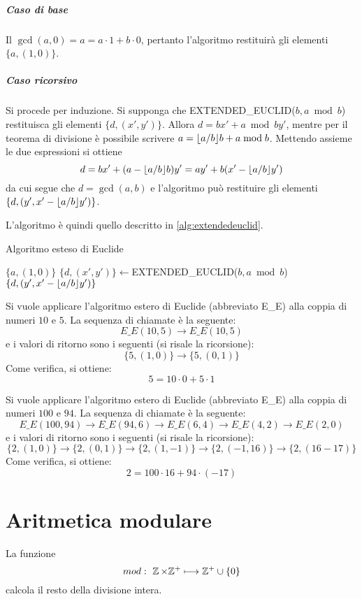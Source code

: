 \subparagraph{Caso di base} Il $\gcd(a,0)=a=a\cdot 1 + b\cdot 0$, pertanto l'algoritmo restituirà gli elementi $\{a, (1,0)\}$.
\subparagraph{Caso ricorsivo} Si procede per induzione. Si supponga che EXTENDED\_EUCLID($b,a\bmod b$) restituisca gli elementi $\{d, (x',y')\}$. Allora $d=bx' + a\bmod by'$, mentre per il teorema di divisione è possibile scrivere $a=\lfloor a/b\rfloor b+a\bmod b$. Mettendo assieme le due espressioni si ottiene
\[
d=bx' + (a-\lfloor a/b\rfloor b)y'=ay'+b(x'-\lfloor a/b\rfloor y')
\]
da cui segue che $d=\gcd(a,b)$ e l'algoritmo può restituire gli elementi $\{d, (y',x'-\lfloor a/b\rfloor y')\}$.


L'algoritmo è quindi quello descritto in \ref{alg:extendedeuclid}.


\begin{algorithm}
\caption{Algoritmo esteso di Euclide}
\label{alg:extendedeuclid}
\begin{algorithmic}
		\State \Return $\{a, (1,0)\}$
	\EndIf
	\State $\{d, (x',y')\} \gets $EXTENDED\_EUCLID($b,a\bmod b$)
	\State \Return $\{d, (y',x'-\lfloor a/b\rfloor y')\}$
\EndFunction
\end{algorithmic}
\end{algorithm}

\begin{esempio}
 Si vuole applicare l'algoritmo estero di Euclide (abbreviato E\_E) alla coppia di numeri $10$ e $5$. La sequenza di chiamate è la seguente:
 \[
  E\_E(10,5) \longrightarrow E\_E(10,5)
 \]
 e i valori di ritorno sono i seguenti (si risale la ricorsione):
 \[
  \{5, (1,0)\} \longrightarrow \{5, (0,1)\}
 \]
 Come verifica, si ottiene:
 \[
  5 = 10 \cdot 0 + 5 \cdot 1
 \]
\end{esempio}

\begin{esempio}
 Si vuole applicare l'algoritmo estero di Euclide (abbreviato E\_E) alla coppia di numeri $100$ e $94$. La sequenza di chiamate è la seguente:
 \[
  E\_E(100,94) \longrightarrow E\_E(94,6) \longrightarrow E\_E(6,4) \longrightarrow E\_E(4,2) \longrightarrow E\_E(2,0)
 \]
 e i valori di ritorno sono i seguenti (si risale la ricorsione):
 \[
  \{2, (1,0)\} \longrightarrow \{2, (0,1)\} \longrightarrow \{2, (1,-1)\} \longrightarrow \{2, (-1,16)\} \longrightarrow \{2, (16-17)\}
 \]
 Come verifica, si ottiene:
 \[
  2 = 100 \cdot 16 + 94 \cdot (-17)
 \]
\end{esempio}


\section{Aritmetica modulare}
La funzione 
\[
mod:\ \operatorname*{\mathbb{Z}} \times \mathbb{Z}^{+} \longmapsto \mathbb{Z}^{+}\cup\{0\}
\]
calcola il resto della divisione intera.

